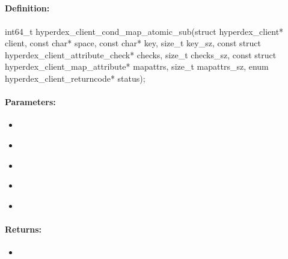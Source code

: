 \pagebreak
\subsection{}
\label{api:c:cond_map_atomic_sub}


\paragraph{Definition:}
\begin{ccode}
int64_t hyperdex_client_cond_map_atomic_sub(struct hyperdex_client* client,
        const char* space,
        const char* key, size_t key_sz,
        const struct hyperdex_client_attribute_check* checks, size_t checks_sz,
        const struct hyperdex_client_map_attribute* mapattrs, size_t mapattrs_sz,
        enum hyperdex_client_returncode* status);
\end{ccode}

\paragraph{Parameters:}
\begin{itemize}[noitemsep]
\item {}\\

\item {}\\

\item {}\\

\item {}\\

\item {}\\

\end{itemize}

\paragraph{Returns:}
\begin{itemize}[noitemsep]
\item {}\\

\end{itemize}

